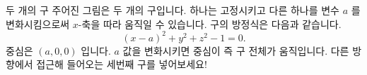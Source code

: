 \begin{surferPage}{두 개의 구}
주어진 그림은 두 개의 구입니다. 하나는 고정시키고 다른 하나를 변수 $a$ 를 변화시킴으로써 $x$-축을 따라 움직일 수 있습니다.
구의 방정식은 다음과 같습니다.
\[(x-a)^2+y^2+z^2-1=0.\]
중심은 $(a,0,0)$ 입니다.  $a$ 값을 변화시키면 중심이 즉 구 전체가 움직입니다. 다른 방향에서 접근해 들어오는 세번째 구를 넣어보세요!
\end{surferPage}
